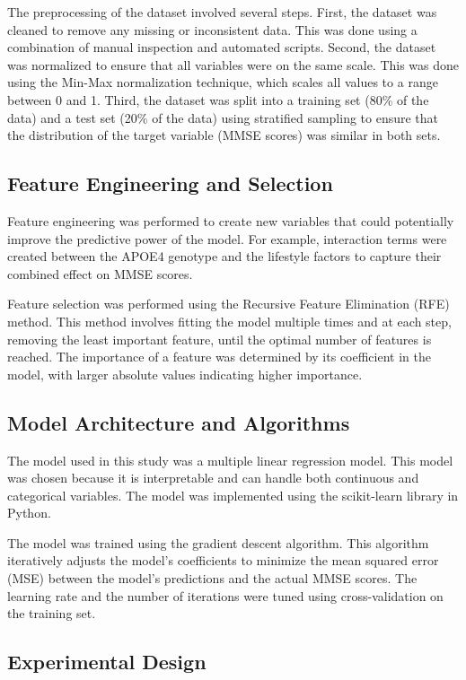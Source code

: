 \documentclass[conference]{IEEEtran}
\begin{document}
The preprocessing of the dataset involved several steps. First, the dataset was cleaned to remove any missing or inconsistent data. This was done using a combination of manual inspection and automated scripts. Second, the dataset was normalized to ensure that all variables were on the same scale. This was done using the Min-Max normalization technique, which scales all values to a range between 0 and 1. Third, the dataset was split into a training set (80\% of the data) and a test set (20\% of the data) using stratified sampling to ensure that the distribution of the target variable (MMSE scores) was similar in both sets.

\subsection{Feature Engineering and Selection}

Feature engineering was performed to create new variables that could potentially improve the predictive power of the model. For example, interaction terms were created between the APOE4 genotype and the lifestyle factors to capture their combined effect on MMSE scores. 

Feature selection was performed using the Recursive Feature Elimination (RFE) method. This method involves fitting the model multiple times and at each step, removing the least important feature, until the optimal number of features is reached. The importance of a feature was determined by its coefficient in the model, with larger absolute values indicating higher importance.

\subsection{Model Architecture and Algorithms}

The model used in this study was a multiple linear regression model. This model was chosen because it is interpretable and can handle both continuous and categorical variables. The model was implemented using the scikit-learn library in Python.

The model was trained using the gradient descent algorithm. This algorithm iteratively adjusts the model's coefficients to minimize the mean squared error (MSE) between the model's predictions and the actual MMSE scores. The learning rate and the number of iterations were tuned using cross-validation on the training set.

\subsection{Experimental Design}
\end{document}
